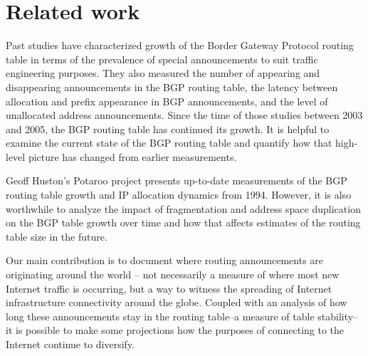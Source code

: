 \section{Related work}
\label{sec:related_work}

Past studies \cite{Meng:2005:IPv4-address} \cite{Xu:2003:IPv4-Address}
\cite{Meng:2003:An-analysis-of-BGP-routing} have characterized growth of the
Border Gateway Protocol routing table in terms of the prevalence of special
announcements to suit traffic engineering purposes. They also measured the
number of appearing and disappearing announcements in the BGP routing table,
the latency between allocation and prefix appearance in BGP announcements, and
the level of unallocated address announcements. Since the time of those
studies between 2003 and 2005, the BGP routing table has continued its growth.
It is helpful to examine the current state of the BGP routing table and
quantify how that high-level picture has changed from earlier measurements.

Geoff Huston's Potaroo project \cite{::IPv4-Address-Report} presents
up-to-date measurements of the BGP routing table growth and IP allocation
dynamics from 1994. However, it is also worthwhile to analyze the impact of
fragmentation and address space duplication on the BGP table growth over time
and how that affects estimates of the routing table size in the future.

Our main contribution is to document where routing announcements are
originating around the world -- not necessarily a measure of where most new
Internet traffic is occurring, but a way to witness the spreading of Internet
infrastructure connectivity around the globe. Coupled with an analysis of how
long these announcements stay in the routing table--a measure of table
stability--it is possible to make some projections how the purposes of
connecting to the Internet continue to diversify.
